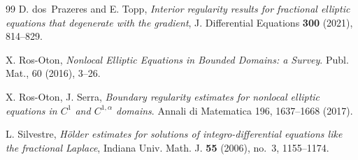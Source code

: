 \documentclass[reqno,11pt]{amsart}
\numberwithin{equation}{section}
\numberwithin{equation}{section}
\begin{document}
\begin{thebibliography}{99}
 D. dos~Prazeres and E. Topp, \textit{Interior regularity results for fractional elliptic equations that degenerate with the gradient}, J. Differential Equations {\bf 300} (2021), 814--829.

 X. Ros-Oton, \textit{Nonlocal Elliptic Equations in Bounded Domains: a Survey}. Publ. Mat., 60 (2016), 3--26.

 X. Ros-Oton, J. Serra, \textit{Boundary regularity estimates for nonlocal elliptic equations in 
$C^1$ and $C^{1,\alpha}$ domains}. Annali di Matematica 196, 1637--1668 (2017).

 L. Silvestre, \textit{H\"older estimates for solutions of integro-differential equations like the fractional Laplace}, Indiana Univ. Math. J. {\bf 55} (2006), no.~3, 1155--1174.

\end{thebibliography}
\end{document}

